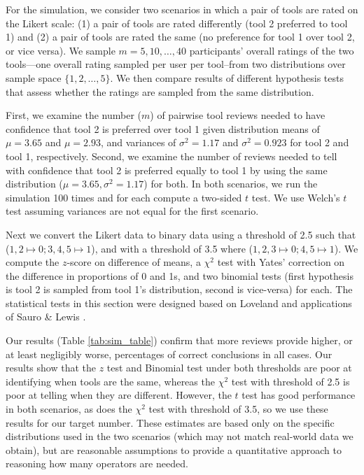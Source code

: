 For the simulation, we consider two scenarios in which a pair of tools are rated on the  Likert scale: (1) a pair of tools are rated differently (tool 2 preferred to tool 1) and (2) a pair of tools are rated the same (no preference for tool 1 over tool 2, or vice versa).
We sample $m = 5, 10, \dots, 40$ participants' overall ratings of the two tools---one overall rating sampled per user per tool--from two distributions over sample space $\{1, 2, \dots, 5\}$. We then compare results of different hypothesis tests that assess whether the ratings are sampled from the same distribution.

First, we examine the number ($m$) of pairwise tool reviews needed to have confidence that tool 2 is preferred over tool 1 given distribution means of $\mu = 3.65$ and $\mu = 2.93$, and variances of $\sigma^2 = 1.17$ and $\sigma^2 = 0.923$ for tool 2 and tool 1, respectively. 
Second, we examine the number of reviews needed to tell with confidence that tool 2 is preferred equally to tool 1 by using the same distribution ($\mu = 3.65, \sigma^2 = 1.17$) for both. 
In both scenarios, we run the simulation 100 times and for each compute a two-sided $t$ test. We use Welch's $t$ test assuming variances are not equal for the first scenario. 

Next we convert the Likert data to binary data using a threshold of 2.5 such that ($1,2 \mapsto 0; 3,4,5 \mapsto 1$), and with a threshold of 3.5 where ($1,2,3 \mapsto 0; 4,5 \mapsto 1$). 
We compute the $z$-score on difference of means, a $\chi^2$ test with Yates' correction on the difference in proportions of 0 and 1s, and two binomial tests (first hypothesis is tool 2 is sampled from tool 1's distribution, second is vice-versa) for each. 
The statistical tests in this section were designed based on Loveland \cite{Loveland} and applications of Sauro \& Lewis \cite{Sauro_Lewis_2012}. 
 
Our results (Table \ref{tab:sim_table}) confirm that more reviews provide higher, or at least negligibly worse, percentages of correct conclusions in all cases. 
Our results show that the $z$ test and Binomial test under both thresholds are poor at identifying when tools are the same, whereas the $\chi^2$ test with threshold of 2.5 is poor at telling when they are different. 
However, the $t$ test has good performance in both scenarios, as does the $\chi^2$ test with threshold of 3.5, so we use these results for our target number. 
These estimates are based only on the specific distributions used in the two scenarios (which may not match real-world data we obtain), but are reasonable assumptions to provide a quantitative approach to reasoning how many operators are needed. 

